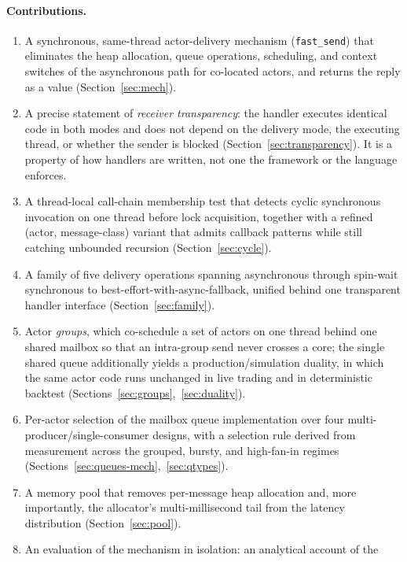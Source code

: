 \documentclass[11pt]{article}
\newcommand{\fs}{\texttt{fast\_send}}
\begin{document}
\paragraph{Contributions.}
\begin{enumerate}[leftmargin=1.6em]
  \item A synchronous, same-thread actor-delivery mechanism (\fs{}) that
  eliminates the heap allocation, queue operations, scheduling, and context
  switches of the asynchronous path for co-located actors, and returns the reply
  as a value (Section~\ref{sec:mech}).
  \item A precise statement of \emph{receiver transparency}: the handler
  executes identical code in both modes and does not depend on the delivery
  mode, the executing thread, or whether the sender is blocked
  (Section~\ref{sec:transparency}). It is a property of how handlers are
  written, not one the framework or the language enforces.
  \item A thread-local call-chain membership test that detects cyclic
  synchronous invocation on one thread before lock acquisition, together with a
  refined (actor, message-class) variant that admits callback patterns while
  still catching unbounded recursion (Section~\ref{sec:cycle}).
  \item A family of five delivery operations spanning asynchronous through
  spin-wait synchronous to best-effort-with-async-fallback, unified behind one
  transparent handler interface (Section~\ref{sec:family}).
  \item Actor \emph{groups}, which co-schedule a set of actors on one thread
  behind one shared mailbox so that an intra-group send never crosses a core; the
  single shared queue additionally yields a production/simulation duality, in
  which the same actor code runs unchanged in live trading and in deterministic
  backtest (Sections~\ref{sec:groups},~\ref{sec:duality}).
  \item Per-actor selection of the mailbox queue implementation over four
  multi-producer/single-consumer designs, with a selection rule derived from
  measurement across the grouped, bursty, and high-fan-in regimes
  (Sections~\ref{sec:queues-mech},~\ref{sec:qtypes}).
  \item A memory pool that removes per-message heap allocation and, more
  importantly, the allocator's multi-millisecond tail from the latency
  distribution (Section~\ref{sec:pool}).
  \item An evaluation of the mechanism in isolation: an analytical account of the

\end{enumerate}
\end{document}
